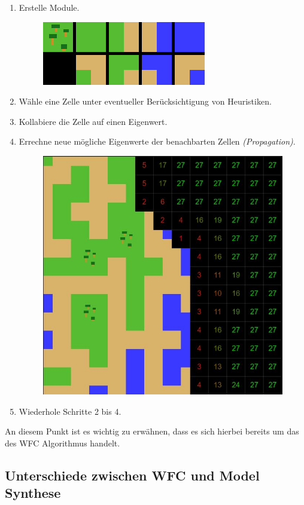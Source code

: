 \documentclass[12pt, a4paper,twoside,openright]{report} %
\begin{document}
\begin{enumerate}
    \itemsep-1em
    \item Erstelle Module.
    \begin{figure}[H]
        \centering
        \includegraphics[width=0.4\linewidth]{images/modules-cells.JPG}
    \end{figure}
    \item Wähle eine Zelle unter eventueller Berücksichtigung von Heuristiken.
    \item Kollabiere die Zelle auf einen Eigenwert.
    \item Errechne neue mögliche Eigenwerte der benachbarten Zellen \textit{(Propagation)}.
    \begin{figure}[H]
        \centering
        \includegraphics[width=0.6\linewidth]{images/collapse-cells.JPG}
    \end{figure}
    \item Wiederhole Schritte 2 bis 4.
\end{enumerate}

An diesem Punkt ist es wichtig zu erwähnen,
dass es sich hierbei bereits um das  des WFC Algorithmus handelt.

\subsection{Unterschiede zwischen WFC und Model Synthese}
\end{document}
